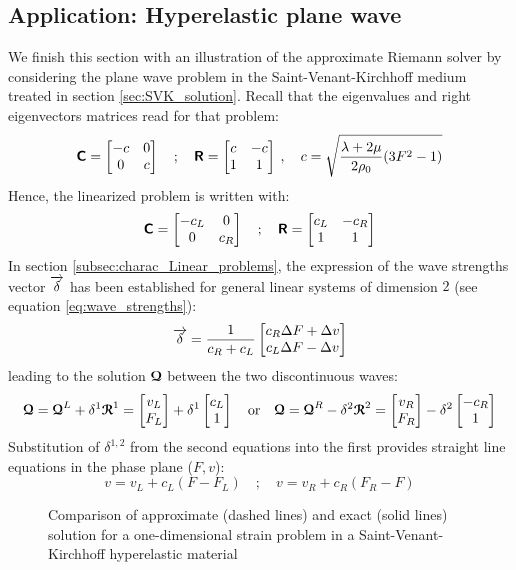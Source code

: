 \subsection{Application: Hyperelastic plane wave}
We finish this section with an illustration of the approximate Riemann solver by considering the plane wave problem in the Saint-Venant-Kirchhoff medium treated in section \ref{sec:SVK_solution}.
Recall that the eigenvalues and right eigenvectors matrices read for that problem:
\begin{equation}
  \label{eq:SVK_matrices}
  \boldsymbol{\mathsf{C}} = \left[\begin{matrix}-c & 0 \\ 0 & c\end{matrix}\right] \quad ; \quad \boldsymbol{\mathsf{R}} = \left[\begin{matrix}c & -c\\ 1&1\end{matrix}\right] \:,\quad c=\sqrt{\frac{\lambda + 2\mu}{2\rho_0}(3F^2-1)}
\end{equation}
Hence, the linearized problem is written with:
\begin{equation}
  \label{eq:SVK_matrices_linear}
  \boldsymbol{\mathsf{C}} = \left[\begin{matrix}-c_L & 0 \\ 0 & c_R\end{matrix}\right] \quad ; \quad \boldsymbol{\mathsf{R}} = \left[\begin{matrix}c_L & -c_R\\ 1&1\end{matrix}\right]
\end{equation}
In section \ref{subsec:charac_Linear_problems}, the expression of the wave strengths vector ${\overrightarrow{\delta}}$ has been established for general linear systems of dimension $2$ (see equation \eqref{eq:wave_strengths}):
\begin{equation}
  {\overrightarrow{\delta}}=\frac{1}{c_R+c_L}\left[\begin{matrix}c_R \Delta F +\Delta v\\ c_L \Delta F -\Delta v\end{matrix}\right]
\end{equation}
leading to the solution ${\boldsymbol{\mathcal{Q}}} $ between the two discontinuous waves:
\begin{equation}
  \label{eq:SVK_approx_solution}
  {\boldsymbol{\mathcal{Q}}}  = {\boldsymbol{\mathcal{Q}}}^L + \delta^1 {\boldsymbol{\mathcal{R}}}^1 = \left[\begin{matrix}v_L \\F_L\end{matrix}\right] +\delta^1 \left[\begin{matrix}c_L \\1\end{matrix}\right] \quad \text{or} \quad {\boldsymbol{\mathcal{Q}}}  = {\boldsymbol{\mathcal{Q}}}^R - \delta^2 {\boldsymbol{\mathcal{R}}}^2 = \left[\begin{matrix}v_R \\F_R\end{matrix}\right] -\delta^2 \left[\begin{matrix}-c_R \\1\end{matrix}\right]
\end{equation}
Substitution of $\delta^{1,2}$ from the second equations into the first provides straight line equations in the phase plane ($F,v$):
\begin{equation}
  \label{eq:approx_straight}
  v  = v_L + c_L(F -F_L) \quad ; \quad v  = v_R + c_R(F_R-F )
\end{equation}
\begin{figure}[h!]
  \centering
  {  \label{subfig:SVK_Approx1}}
  {  \label{subfig:SVK_Approx4}}
  \caption{Comparison of approximate (dashed lines) and exact (solid lines) solution for a one-dimensional strain problem in a Saint-Venant-Kirchhoff hyperelastic material}
  \label{fig:comparison_exact_approx}
\end{figure}
